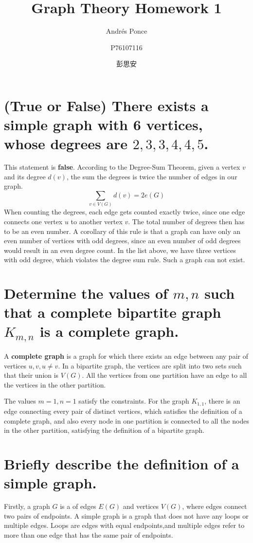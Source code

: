 \documentclass{article}
\title{Graph Theory Homework 1}
\author{Andr\'es Ponce \\
\and
P76107116
\and
彭思安}
\begin{document}
\maketitle
\section{(True or False) There exists a simple graph with 6 vertices, whose degrees are $2,3,3,4,4,5$. }
This statement is \textbf{false}.
According to the Degree-Sum Theorem, given a vertex $v$ and its degree $d(v)$, the sum the degrees is 
twice the number of edges in our graph.
		\begin{equation}
				\sum_{v\in V(G)} d(v) = 2e(G)
		\end{equation}
When counting the degrees, each edge gets counted exactly twice, since one edge connects one vertex $u$ to another vertex $v$.
The total number of degrees then has to be an even number.
A corollary of this rule is that a graph can have only an even number of vertices with odd degrees, since an even number of odd degrees 
would result in an even degree count.
In the list above, we have three vertices with odd degree, which violates the degree sum rule. 
Such a graph can not exist.

\section{Determine the values of $m,n$ such that a complete bipartite graph $K_{m,n}$ is a complete graph.}
A \textbf{complete graph} is a graph for which there exists an edge between any pair of vertices $u, v, u\neq v$.
In a bipartite graph, the vertices are split into two sets such that their union is $V(G)$.
All the vertices from one partition have an edge to all the vertices in the other partition.

The values $m=1, n=1$ satisfy the constraints.
For the graph $K_{1,1}$, there is an edge connecting every pair of distinct vertices, which satisfies the definition of a complete graph,
and also every node in one partition is connected to all the nodes in the other partition, satisfying the definition of a bipartite graph.

\section{Briefly describe the definition of a simple graph.}
Firstly, a graph $G$ is a of edges $E(G)$ and vertices $V(G)$, where edges connect two pairs of endpoints.
A simple graph is a graph that does not have any loops or multiple edges.
Loops are edges with equal endpoints,and multiple edges refer to more than one edge that has the same pair of 
endpoints.
\end{document}
